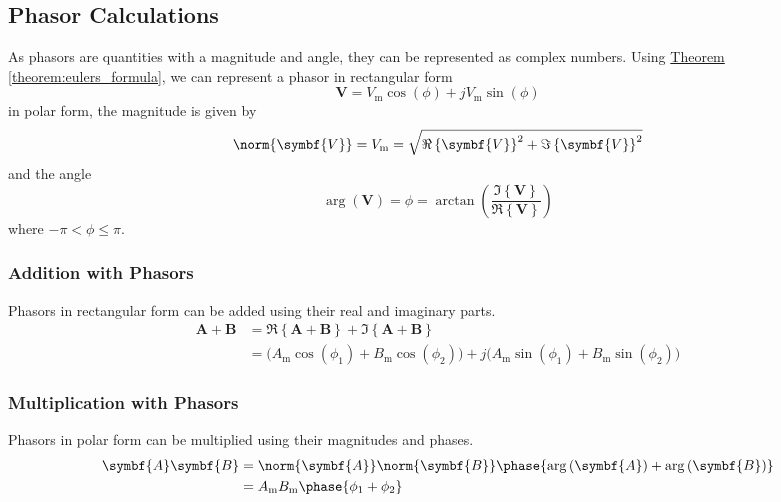 \documentclass{article}
\begin{document}
\subsection{Phasor Calculations}
As phasors are quantities with a magnitude and angle, they can be represented as complex numbers.
Using \hyperref[theorem:eulers_formula]{Theorem \ref{theorem:eulers_formula}}, we can represent a phasor in rectangular form
\begin{equation*}
    \symbf{V} = V_{\mathrm{m}} \cos{\left( \phi \right)} + j V_{\mathrm{m}} \sin{\left( \phi \right)}
\end{equation*}
in polar form, the magnitude is given by
\begin{equation*}
    \norm{\symbf{V}} = V_{\mathrm{m}} = \sqrt{\Re\left\{ \symbf{V} \right\}^2 + \Im\left\{ \symbf{V} \right\}^2}
\end{equation*}
and the angle
\begin{equation*}
    \arg{\left( \symbf{V} \right)} = \phi = \arctan{\left( \frac{\Im\left\{ \symbf{V} \right\}}{\Re\left\{ \symbf{V} \right\}} \right)}
\end{equation*}
where $-\pi < \phi \leq \pi$.
\subsubsection{Addition with Phasors}
Phasors in rectangular form can be added using their real and imaginary parts.
\begin{align*}
    \symbf{A} + \symbf{B} & = \Re\left\{ \symbf{A} + \symbf{B} \right\} + \Im\left\{ \symbf{A} + \symbf{B} \right\}                                                                                                                      \\
                          & = \bigl( A_{\mathrm{m}}\cos{\left( \phi_1 \right)} + B_{\mathrm{m}}\cos{\left( \phi_2 \right)} \bigr) + j\bigl( A_{\mathrm{m}}\sin{\left( \phi_1 \right)} + B_{\mathrm{m}}\sin{\left( \phi_2 \right)} \bigr)
\end{align*}
\subsubsection{Multiplication with Phasors}
Phasors in polar form can be multiplied using their magnitudes and phases.
\begin{align*}
    \symbf{A} \symbf{B} & = \norm{\symbf{A}} \norm{\symbf{B}} \phase{\arg{\left( \symbf{A} \right)} + \arg{\left( \symbf{B} \right)}} \\
                        & = A_{\mathrm{m}} B_{\mathrm{m}} \phase{\phi_1 + \phi_2}
\end{align*}
\end{document}
